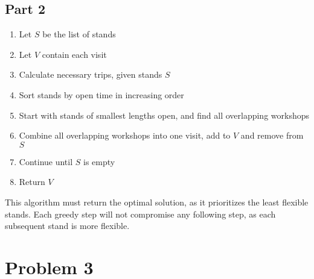 \documentclass{article}
\begin{document}
\subsection{Part 2}

\begin{enumerate}
    \item Let $S$ be the list of stands
    \item Let $V$ contain each visit
    \item Calculate necessary trips, given stands $S$
    \item Sort stands by open time in increasing order
    \item Start with stands of smallest lengths open, and find all overlapping workshops
    \item Combine all overlapping workshops into one visit, add to $V$ and remove from $S$
    \item Continue until $S$ is empty
    \item Return $V$
\end{enumerate}

This algorithm must return the optimal solution, as it prioritizes the least flexible stands.
Each greedy step will not compromise any following step, as each subsequent stand is more flexible.

\section{Problem 3}
\end{document}
